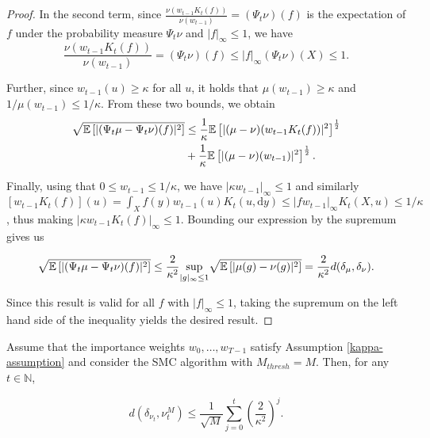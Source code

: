\begin{proof}
  In the second term, since $\frac{\nu(w_{t-1}K_t(f))}{\nu(w_{t-1})} = (\Psi_t \nu)(f)$ is the expectation of $f$ under the probability measure $\Psi_t\nu$ and $|f|_\infty \le 1$, we have
  \begin{equation*}
    \frac{\nu(w_{t-1}K_t(f))}{\nu(w_{t-1})} = (\Psi_t\nu)(f) \le |f|_\infty(\Psi_t\nu)(X) \le 1.
  \end{equation*}

  Further, since $w_{t-1}(u) \ge \kappa$ for all $u$, it holds that $\mu(w_{t-1}) \ge \kappa$ and $1 / \mu(w_{t-1}) \le 1/\kappa$. From these two bounds, we obtain
  \begin{equation*}
    \begin{aligned}
      \sqrt{\mathbb{E}\left[|(\Psi_t\mu - \Psi_t\nu)(f)|^2\right]}
      &\le \frac1\kappa\mathbb{E}\left[|(\mu - \nu)(w_{t-1}K_t(f))|^2\right]^{\frac12}\\
      &+ \frac1\kappa\mathbb{E}\left[|(\mu - \nu)(w_{t-1})|^2\right]^{\frac12}.
    \end{aligned}
  \end{equation*}


  Finally, using that $0 \le w_{t-1} \le 1/\kappa$, we have $|\kappa w_{t-1}|_\infty \le 1$ and similarly $[w_{t-1}K_t(f)](u) = \int_X f(y)w_{t-1}(u)K_t(u, \text{d}y) \leq |fw_{t-1}|_\infty K_t(X, u) \leq 1 / \kappa$, thus making $|\kappa w_{t-1}K_t(f)|_\infty \leq 1$. Bounding our expression by the supremum gives us 

  \begin{equation*}
    \sqrt{\mathbb{E}\left[|(\Psi_t\mu - \Psi_t\nu)(f)|^2\right]} \le \frac2{\kappa^2}\underset{|g|_\infty \le 1}{\text{sup}} \sqrt{\mathbb{E}\left[|\mu(g) - \nu(g)|^2\right]} =  \frac2{\kappa^2}d(\delta_\mu, \delta_\nu).
  \end{equation*}

  Since this result is valid for all $f$ with $|f|_\infty \le 1$, taking the supremum on the left hand side of the inequality yields the desired result.
\end{proof}

\begin{theorem}\label{smc-convergence}
  Assume that the importance weights $w_0, \ldots, w_{T-1}$ satisfy Assumption \ref{kappa-assumption} and consider the SMC algorithm with $M_{thresh} = M$. Then, for any $t \in \mathbb{N}$,

  \begin{equation*}
    d(\delta_{\nu_t}, \nu_t^M) \leq \frac1{\sqrt{M}}\sum_{j=0}^t\left(\frac2{\kappa^2}\right)^j.
  \end{equation*}
\end{theorem}


